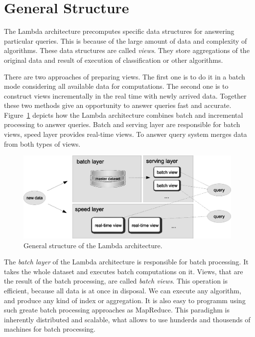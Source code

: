\section{General Structure}

The Lambda architecture precomputes specific data structures for answering particular queries.
This is because of the large amount of data and complexity of algorithms.
These data structures are called \textit{views}.
They store aggregations of the original data and result of execution of classification or other algorithms.

There are two approaches of preparing views.
The first one is to do it in a batch mode considering all available data for computations.
The second one is to construct views incrementally in the real time with newly arrived data.
Together these two methods give an opportunity to answer queries fast and accurate.
Figure~\ref{fig:lambda_architecture} depicts how the Lambda architecture combines batch and incremental processing to answer queries.
Batch and serving layer are responsible for batch views, speed layer provides real-time views.
To answer query system merges data from both types of views.

\begin{figure}[h]
  \centering
  \includegraphics [width=1.0\textwidth]{images/LambdaArchitecture}
  \caption{General structure of the Lambda architecture.}
  \label{fig:lambda_architecture}
\end{figure}

The \textit{batch layer}  of the Lambda architecture is responsible for batch processing.
It takes the whole dataset and executes batch computations on it.
Views, that are the result of the batch processing, are called \textit{batch views}.
This operation is efficient, because all data is at once in disposal.
We can execute any algorithm, and produce any kind of index or aggregation.
It is also easy to programm using such greate batch processing approaches as MapReduce.
This paradighm is inherently distributed and scalable, what allows to use hunderds and thousends of machines for batch processing.


